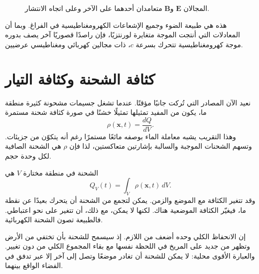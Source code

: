 \begin{figure}[H]
\centering
{}
\caption{المجالان \(\mathbf E\) و\(\mathbf B\) متعامدان أحدهما على الآخر وعلى اتجاه الانتشار.}
\end{figure}

هذه هي طبيعة الضوء وجميع الإشعاعات الكهرومغناطيسية في الفراغ. وبما أن المعادلات التي أنتجت الموجة متغايرة لورنتزيًا، فإن راصدًا قصوريًا آخر يصف بدوره موجة كهرومغناطيسية تتحرك بسرعة \(c\)، ذات مجالين كهربائي ومغناطيسي عرضيين.

\section{كثافة الشحنة وكثافة التيار}

نعيد الآن المصادر التي تُركت جانبًا مؤقتًا. عندما تشغل جسيمات مشحونة كثيرة منطقة ما، يكون من المفيد تمثيلها تمثيلًا خشنًا في صورة كثافة شحنة مستمرة
\begin{equation}
\rho(\mathbf x,t)=\frac{dQ}{dV}.
\end{equation}
وهذا التقريب يشبه معاملة الماء بوصفه مائعًا مستمرًا رغم أنه يتكوّن من جزيئات. وتسهم الشحنات الموجبة والسالبة بإشارتين متعاكستين، لذا فإن \(\rho\) هي الشحنة الصافية لكل وحدة حجم.

الشحنة في منطقة مختارة \(V\) هي
\begin{equation}
Q_V(t)=\int_V\rho(\mathbf x,t)\,dV.
\label{eq:charge-volume}
\end{equation}
وقد تتغير الكثافة مع الموضع والزمن. يمكن لتجمع من الشحنة أن يتحرك بعيدًا عن نقطة ما، فيغيّر الكثافة الموضعية هناك. لكنها لا يمكن، مع ذلك، أن تتغير على نحو اعتباطي. فالطبيعة تصون الشحنة الكهربائية.

إن الانحفاظ الكلي وحده أضعف من اللازم. إذ سيسمح للشحنة بأن تختفي من الأرض وتظهر من جديد على المريخ في اللحظة نفسها مع بقاء المجموع الكلي من دون تغيير. والعبارة الأقوى محلية: لا يمكن للشحنة أن تغادر موضعًا وتصل إلى آخر إلا عبر تدفق في الفضاء الواقع بينهما.

